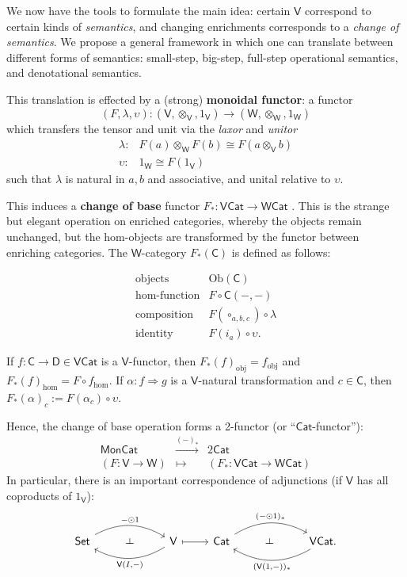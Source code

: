 \documentclass{amsart}
\theoremstyle{definition}
\def\ld{\rotatebox[origin=c]{-90}{$\dashv$}} %
\newcommand{\Set}{\mathsf{Set}}
\newcommand{\Cat}{\mathsf{Cat}}
\newcommand{\Mon}{\mathsf{Mon}}
\newcommand{\V}{\mathsf{V}}
\newcommand{\W}{\mathsf{W}}
\newcommand{\D}{\mathsf{D}}
\newcommand{\C}{\mathsf{C}}
\newcommand{\Obj}{\mathrm{Ob}}
\newcommand{\maps}{\colon}
\begin{document}
We now have the tools to formulate the main idea: certain $\V$ correspond to certain kinds of \textit{semantics}, and changing enrichments corresponds to a \textit{change of semantics}. We propose a general framework in which one can translate between different forms of semantics: small-step, big-step, full-step operational semantics, and denotational semantics.

This translation is effected by a (strong) \textbf{monoidal functor}: a functor $$(F,\lambda,\upsilon)\maps (\V,\otimes_\V,1_\V) \to (\W,\otimes_\W,1_\W)$$ which transfers the tensor and unit via the \textit{laxor} and \textit{unitor}
\[\begin{array}{rl}
\lambda\maps & F(a) \otimes_\W F(b) \cong F(a\otimes_\V b)\\
\upsilon\maps & 1_\W \cong F(1_\V)
\end{array}\]
such that $\lambda$ is natural in $a,b$ and associative, and unital relative to $\upsilon$.

This induces a \textbf{change of base} functor $F_*\maps\V\Cat \to \W\Cat$ \cite{borceux}. This is the strange but elegant operation on enriched categories, whereby the objects remain unchanged, but the hom-objects are transformed by the functor between enriching categories. The $\W$-category $F_*(\C)$ is defined as follows:

\[\begin{array}{rl}
\text{objects} & \Obj(\C)\\
\text{hom-function} & F \circ \C(-,-)\\
\text{composition} & F(\circ_{a,b,c}) \circ \lambda\\
\text{identity} & F(i_a) \circ \upsilon.
\end{array}\]

If $f\maps \C \to \D \in \V\Cat$ is a $\V$-functor, then $F_*(f)_{\text{obj}} = f_{\text{obj}}$ and $F_*(f)_{\text{hom}} = F\circ f_{\text{hom}}$. If $\alpha\maps f \Rightarrow g$ is a $\V$-natural transformation and $c\in \C$, then $F_*(\alpha)_c := F(\alpha_c) \circ \upsilon$.

Hence, the change of base operation forms a 2-functor (or ``$\Cat$-functor''):
\[\begin{array}{ccc}
\Mon\Cat & \xrightarrow{(-)_*} & 2\Cat\\
(F\maps \V\to\W) & \mapsto & (F_*\maps \V\Cat\to\W\Cat)
\end{array}\]
In particular, there is an important correspondence of adjunctions (if $\V$ has all coproducts of $1_\V$):
\[\begin{tikzcd}
	\Set \arrow[bend left,below]{rr}{-\odot 1}
	& \ld &
	\arrow[bend left,above]{ll}{\V(I,-)} \V
	\arrow[maps to]{r}
	& \Cat \arrow[bend left,below]{rr}{(-\odot 1)_*}
	& \ld &
	\arrow[bend left,above]{ll}{(\V(1,-))_*} \V\Cat.
\end{tikzcd}\]
\end{document}
